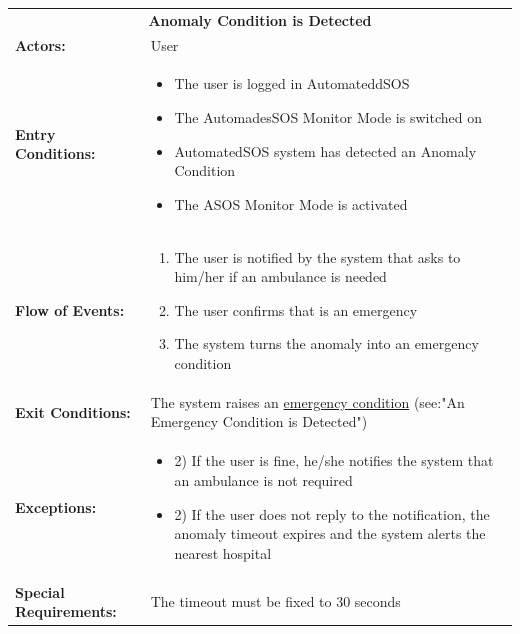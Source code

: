 \begin{table}[H]
	\centering
	{\renewcommand{\arraystretch}{1.5}%
		\begin{tabular}{|@{\hspace{2em}} p{4cm} @{}| p{11cm} @{\qquad}|}
			\cline{1-2}
			\multicolumn{2}{|c|}{\textbf{Anomaly Condition is Detected}} \\ \cline{1-2}
			\textbf{Actors:} & User\\ \cline{1-2}
			\textbf{Entry Conditions:} & \begin{itemize}[topsep=0em, itemsep=-0.2em]
				\item The user is logged in AutomateddSOS
				\item The AutomadesSOS Monitor Mode is switched on
				\item AutomatedSOS system has detected an Anomaly Condition 
				\item The ASOS Monitor Mode is activated
			\end{itemize} \\ \cline{1-2}
			\textbf{Flow of Events:} & \begin{enumerate}[topsep=0em, itemsep=-0.2em]
				\item The user is notified by the system that asks to him/her if an ambulance is needed 
				\item The user confirms that is an emergency
				\item The system turns the anomaly into an emergency condition
			\end{enumerate}\\ \cline{1-2}
			\textbf{Exit Conditions:} & The system raises an \underline{emergency condition} (see:"An Emergency Condition is Detected")\\ \cline{1-2}
			\textbf{Exceptions:} & \begin{itemize}[topsep=0em, itemsep=-0.2em]
				\item 2) If the user is fine, he/she notifies the system that an ambulance is not required
				\item 2) If the user does not reply to the notification, the anomaly timeout expires and the system alerts the nearest hospital
			\end{itemize} \\ \cline{1-2}
			\textbf{Special Requirements:} & The timeout must be fixed to 30 seconds \\ \cline{1-2}
	\end{tabular}} \quad
\end{table}

